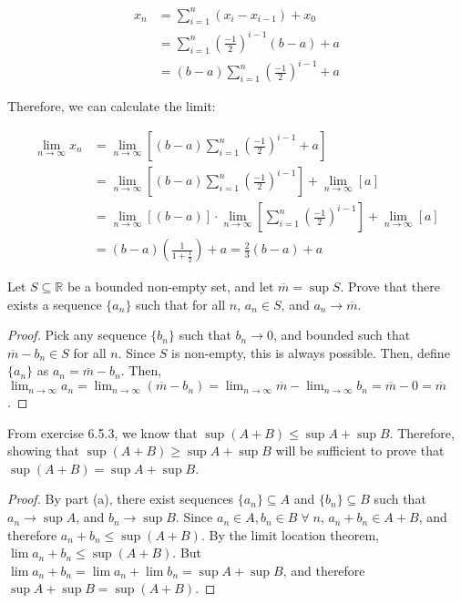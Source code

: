 \begin{align*}
  x_n &= \sum_{i = 1}^{n} (x_i - x_{i - 1}) + x_0 \\
  &= \sum_{i = 1}^{n} \left(\frac{-1}{2}\right)^{i - 1}(b - a) + a\\
  &= (b - a)\sum_{i = 1}^{n} \left(\frac{-1}{2}\right)^{i - 1} + a
\end{align*}

Therefore, we can calculate the limit:

\begin{align*}
  \lim_{n \rightarrow \infty} x_n &= \lim_{n \rightarrow \infty} \left[(b - a)\sum_{i = 1}^{n} \left(\frac{-1}{2}\right)^{i - 1} + a\right] \\
  &= \lim_{n \rightarrow \infty} \left[(b - a)\sum_{i = 1}^{n} \left(\frac{-1}{2}\right)^{i - 1}\right] + \lim_{n \rightarrow \infty} \left[a\right] \\
  &= \lim_{n \rightarrow \infty} \left[(b - a)\right] \cdot \lim_{n \rightarrow \infty} \left[\sum_{i = 1}^{n} \left(\frac{-1}{2}\right)^{i - 1}\right] + \lim_{n \rightarrow \infty} \left[a\right] \\
  &= (b - a)\left(\frac{1}{1 + \frac{1}{2}}\right) + a = \frac{2}{3}(b - a) + a
\end{align*}


Let $S \subseteq \mathbb{R}$ be a bounded non-empty set, and let $\overline{m} = \sup S$. Prove that there exists a sequence $\{a_n\}$ such that for all $n$, $a_n \in S$, and $a_n \rightarrow \overline{m}$.

\begin{proof}
  Pick any sequence $\{b_n\}$ such that $b_n \rightarrow 0$, and bounded such that $\overline{m} - b_n \in S$ for all $n$. Since $S$ is non-empty, this is always possible. Then, define $\{a_n\}$ as $a_n = \overline{m} - b_n$. Then, $\lim_{n \rightarrow \infty} a_n = \lim_{n \rightarrow \infty} (\overline{m} - b_n) = \lim_{n \rightarrow \infty} \overline{m} - \lim_{n \rightarrow \infty} b_n = \overline{m} - 0 = \overline{m}$.
\end{proof}

From exercise 6.5.3, we know that $\sup(A + B) \leq \sup A + \sup B$. Therefore, showing that $\sup(A + B) \geq \sup A + \sup B$ will be sufficient to prove that $\sup(A + B) = \sup A + \sup B$.

\begin{proof}
  By part (a), there exist sequences $\{a_n\} \subseteq A$ and $\{b_n\} \subseteq B$ such that $a_n \rightarrow \sup A$, and $b_n \rightarrow \sup B$. Since $a_n \in A, b_n \in B \;\forall\; n$, $a_n + b_n \in A + B$, and therefore $a_n + b_n \leq \sup(A + B)$. By the limit location theorem, $\lim a_n + b_n \leq \sup(A + B)$. But $\lim a_n + b_n = \lim a_n + \lim b_n = \sup A + \sup B$, and therefore $\sup A + \sup B = \sup(A + B)$.
\end{proof}

